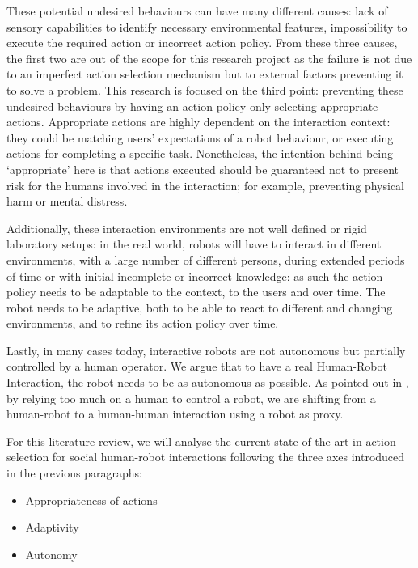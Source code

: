     These potential undesired behaviours can have many different causes: lack of
    sensory capabilities to identify necessary environmental features,
    impossibility to execute the required action or incorrect action policy.
    From these three causes, the first two are out of the scope for this
    research project as the failure is not due to an imperfect action selection
    mechanism but to external factors preventing it to solve a problem. This
    research is focused on the third point: preventing these undesired
    behaviours by having an action policy only selecting appropriate actions.
    Appropriate actions are highly dependent on the interaction context: they
    could be matching users' expectations of a robot behaviour, or executing
    actions for completing a specific task. Nonetheless, the intention behind
    being `appropriate' here is that actions executed should be guaranteed not
    to present risk for the humans involved in the interaction; for example,
    preventing physical harm or mental distress.

    Additionally, these interaction environments are not well defined or rigid
    laboratory setups: in the real world, robots will have to interact in
    different environments, with a large number of different persons, during
    extended periods of time or with initial incomplete or incorrect knowledge:
    as such the action policy needs to be adaptable to the context, to the users
    and over time. The robot needs to be adaptive, both to be able to react to
    different and changing environments, and to refine its action policy over
    time.

    Lastly, in many cases today, interactive robots are not autonomous but
    partially controlled by a human operator. We argue that to have a real
    Human-Robot Interaction, the robot needs to be as autonomous as possible. As
    pointed out in  \citet{baxter2016characterising}, by relying too much on a
    human to control a robot, we are shifting from a human-robot to a
    human-human interaction using a robot as proxy. 

    For this literature review, we will analyse the current state of the art in
    action selection for social human-robot interactions following the three
    axes introduced in the previous paragraphs:

    \begin{itemize}
        \item Appropriateness of actions
        \item Adaptivity
        \item Autonomy
    \end{itemize}

